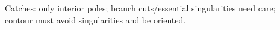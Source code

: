 \documentclass[preview]{standalone}
\begin{document}
\begin{center}
Catches: only interior poles; branch cuts/essential singularities need care; \\ contour must avoid singularities and be oriented.
\end{center}
\end{document}

